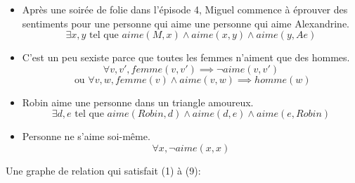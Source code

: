 \documentclass{article}
\begin{document}
\begin{itemize}
        \item {} Après une soirée de folie dans l’épisode 4, Miguel commence à éprouver des sentiments pour une personne qui aime une personne qui aime Alexandrine.
            \begin{equation}
            \exists x, y \text{ tel que } aime(M, x) \land aime(x, y) \land aime(y, Ae)
            \end{equation}
        \item C’est un peu sexiste parce que toutes les femmes n’aiment que des hommes.
            \begin{equation}
            \forall v, v', femme(v, v') \implies \neg aime(v, v')
            \end{equation}
            \begin{equation}
            \text{ ou } \forall v, w, femme(v) \land aime(v, w) \implies homme(w)
            \end{equation}
        \item Robin aime une personne dans un triangle amoureux.
            \begin{equation}
            \exists d, e \text{ tel que } aime(Robin, d) \land aime(d, e) \land aime(e, Robin)
            \end{equation}
        \item Personne ne s’aime soi-même.
            \begin{equation}
            \forall x, \neg aime(x, x)
            \end{equation}
    \end{itemize}
    Une graphe de relation qui satisfait (1) à (9): \\
\end{document}
